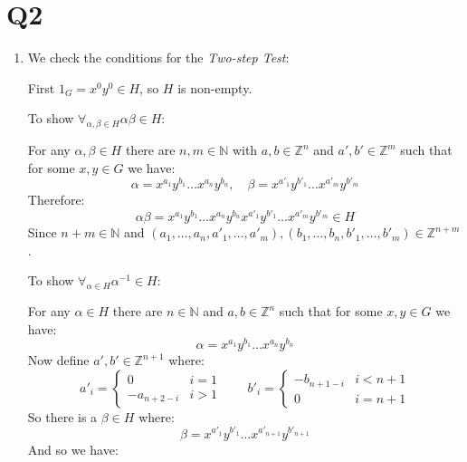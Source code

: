 \documentclass[a4paper, 11pt]{article}
\newcommand{\NN}{\mathbb{N}}
\newcommand{\ZZ}{\mathbb{Z}}
\begin{document}
\pagebreak
\section*{Q2}
\begin{enumerate}[label=(\alph*)]
	\item 
	We check the conditions for the \textit{Two-step Test}:

	First $1_G=x^0y^0\in H$, so $H$ is non-empty.

	To show $\forall_{\alpha,\beta\in H}\alpha\beta\in H$:
	\begin{mdframed}
		For any $\alpha,\beta\in H$ there are $n,m\in\NN$ with $a,b\in\ZZ^n$ and $a',b'\in\ZZ^m$ such that for some $x,y\in G$ we have: 
		\[
			\alpha = x^{a_1}y^{b_1}\dots x^{a_n}y^{b_n},\quad
			\beta  = x^{a'_1}y^{b'_1}\dots x^{a'_m}y^{b'_m}	
		\]
		Therefore: 
		\[
			\alpha\beta = x^{a_1}y^{b_1}\dots x^{a_n}y^{b_n}x^{a'_1}y^{b'_1}\dots x^{a'_m}y^{b'_m}\in H	
		\]
		Since $n+m\in\NN$ and $(a_1,\dots,a_n,a'_1,\dots,a'_m),(b_1,\dots,b_n,b'_1,\dots,b'_m)\in\ZZ^{n+m}$.
	\end{mdframed}

	To show $\forall_{\alpha\in H}\alpha^{-1}\in H$:
	\begin{mdframed}
		For any $\alpha\in H$ there are $n\in\NN$ and $a,b\in\ZZ^n$ such that for some $x,y\in G$ we have: 
		\[
			\alpha = x^{a_1}y^{b_1}\dots x^{a_n}y^{b_n}
		\]
		Now define $a',b'\in\ZZ^{n+1}$ where: 
		\[
			a'_i = \begin{cases}
				0          & i=1  \\ 
				-a_{n+2-i} & i > 1
			\end{cases}
			\qquad b'_i = \begin{cases}
				-b_{n+1-i} & i < n + 1 \\
				0          & i = n + 1   
			\end{cases}
		\]
		So there is a $\beta\in H$ where: 
		\[
			\beta = x^{a'_1}y^{b'_1}\dots x^{a'_{n+1}}y^{b'_{n+1}}	
		\]
		And so we have:



\end{mdframed}
\end{enumerate}
\end{document}
